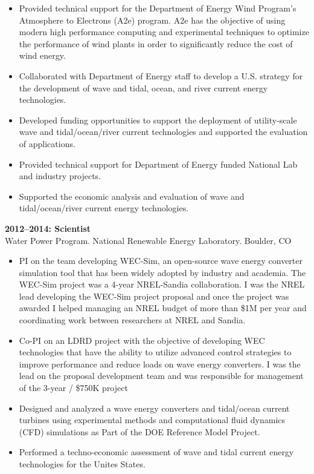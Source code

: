 \begin{itemize}
  \item Provided technical support for the Department of Energy Wind Program's Atmosphere to Electrons (A2e) program. A2e has the objective of using modern high performance computing and experimental techniques to optimize the performance of wind plants in order to significantly reduce the cost of wind energy.
  \vspace{-0.1in}
  \item Collaborated with Department of Energy staff to develop a U.S. strategy for the development of wave and tidal, ocean, and river current energy technologies.
  \vspace{-0.1in}
  \item Developed funding opportunities to support the deployment of utility-scale wave and tidal/ocean/river current technologies and supported the evaluation of applications.
  \vspace{-0.1in}
  \item Provided technical support for Department of Energy funded National Lab and industry projects.
  \vspace{-0.1in}
  \item Supported the economic analysis and evaluation of wave and tidal/ocean/river current energy technologies.
\end{itemize}
\vspace{-0.1in}
\textbf{2012--2014: Scientist}\\
Water Power Program. National Renewable Energy Laboratory. Boulder, CO\\
\vspace{-0.35in}
\begin{itemize}
  \item PI on the team developing WEC-Sim, an open-source wave energy converter simulation tool that has been widely adopted by industry and academia. The WEC-Sim project was a 4-year NREL-Sandia collaboration. I was the NREL lead developing the WEC-Sim project proposal and once the project was awarded I helped managing an NREL budget of more than \$1M per year and coordinating work between researchers at NREL and Sandia.
  \vspace{-0.1in}
  \item Co-PI on an LDRD project with the objective of developing WEC technologies that have the ability to utilize advanced control strategies to improve performance and reduce loads on wave energy converters. I was the lead on the proposal development team and was responsible for management of the 3-year / \$750K project
  \vspace{-0.1in}
  \item Designed and analyzed a wave energy converters and tidal/ocean current turbines using experimental methods and computational fluid dynamics (CFD) simulations as Part of the DOE Reference Model Project.
  \vspace{-0.1in}
  \item Performed a techno-economic assessment of wave and tidal current energy technologies for the Unites States.
\end{itemize}
